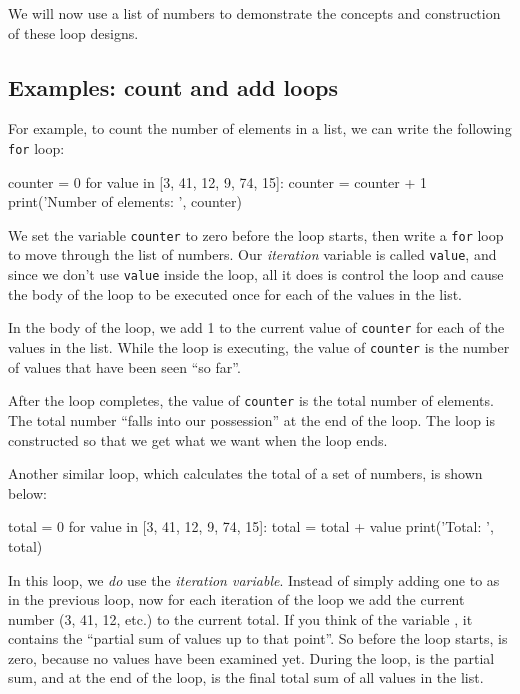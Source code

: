 We will now use a list of numbers to demonstrate the concepts and construction of these loop designs.

\hypertarget{bucles-de-recuento-y-suma}{%
\subsection{Examples: count and add loops}\label{bucles-de-recuento-y-suma}}

For example, to count the number of elements in a list, we can write the following \texttt{for} loop:

\begin{python}[frame=single]
counter = 0
for value in [3, 41, 12, 9, 74, 15]:
    counter = counter + 1
print('Number of elements: ', counter)
\end{python}

We set the variable \texttt{counter} to zero before the loop starts, then write a \texttt{for} loop to move through the list of numbers. Our \emph{iteration} variable is called \texttt{value}, and since we don't use \texttt{value} inside the loop, all it does is control the loop and cause the body of the loop to be executed once for each of the values in the list.

In the body of the loop, we add 1 to the current value of \texttt{counter} for each of the values in the list. While the loop is executing, the value of \texttt{counter} is the number of values that have been seen ``so far''.

After the loop completes, the value of \texttt{counter} is the total number of elements. The total number ``falls into our possession'' at the end of the loop. The loop is constructed so that we get what we want when the loop ends.

Another similar loop, which calculates the total of a set of numbers, is shown below:

\begin{python}[frame=single]
total = 0
for value in [3, 41, 12, 9, 74, 15]:
    total = total + value
print('Total: ', total)
\end{python}

In this loop, we \emph{do} use the \emph{iteration variable}. Instead of simply adding one to  as in the previous loop, now for each iteration of the loop we add the current number (3, 41, 12, etc.) to the current total. If you think of the variable , it contains the ``partial sum of values up to that point''. So before the loop starts,  is zero, because no values have been examined yet. During the loop,  is the partial sum, and at the end of the loop,  is the final total sum of all values in the list.


